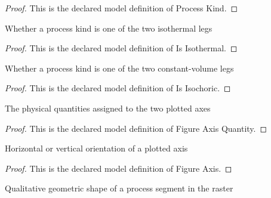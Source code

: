 \begin{proof}
  This is the declared model definition of Process Kind.
\end{proof}
\begin{definition}[Is Isothermal]
  \label{def:physics:phyx-mini-0355:phyxminiproblems-problemphyxmini0355-processkind-isisothermal}
  Whether a process kind is one of the two isothermal legs
\end{definition}
\begin{proof}
  This is the declared model definition of Is Isothermal.
\end{proof}
\begin{definition}[Is Isochoric]
  \label{def:physics:phyx-mini-0355:phyxminiproblems-problemphyxmini0355-processkind-isisochoric}
  Whether a process kind is one of the two constant-volume legs
\end{definition}
\begin{proof}
  This is the declared model definition of Is Isochoric.
\end{proof}
\begin{definition}
  \label{def:physics:phyx-mini-0355:phyxminiproblems-problemphyxmini0355-figureaxisquantity}
  The physical quantities assigned to the two plotted axes
\end{definition}
\begin{proof}
  This is the declared model definition of Figure Axis Quantity.
\end{proof}
\begin{definition}
  \label{def:physics:phyx-mini-0355:phyxminiproblems-problemphyxmini0355-figureaxis}
  Horizontal or vertical orientation of a plotted axis
\end{definition}
\begin{proof}
  This is the declared model definition of Figure Axis.
\end{proof}
\begin{definition}
  \label{def:physics:phyx-mini-0355:phyxminiproblems-problemphyxmini0355-pvsegmentshape}
  Qualitative geometric shape of a process segment in the raster
\end{definition}
